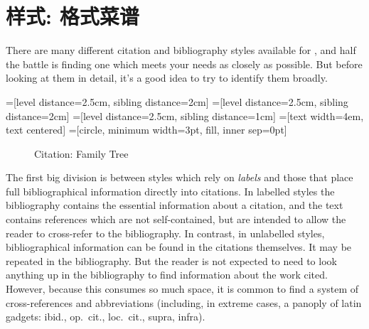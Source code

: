 \chapter{样式: 格式菜谱}\label{ch:bibstyles}

There are many different citation and bibliography styles available
for \biblatex, and half the battle is finding one which meets your
needs as closely as possible. But before looking at them in detail,
it's a good idea to try to identify them broadly.

=[level distance=2.5cm, sibling distance=2cm]
=[level distance=2.5cm, sibling distance=2cm]
=[level distance=2.5cm, sibling distance=1cm]
=[text width=4em, text centered]
=[circle, minimum width=3pt, fill, inner sep=0pt]

\begin{figure}
\sffamily
{}
\caption{Citation: Family Tree}
\end{figure}
The first big division is between styles which rely on \emph{labels}
and those that place full bibliographical information directly into
citations. In labelled styles the bibliography contains the essential
information about a citation, and the text contains references which
are not self-contained, but are intended to allow the reader to
cross-refer to the bibliography. In contrast, in unlabelled styles,
bibliographical information can be found in the citations
themselves. It may be repeated in the bibliography. But the reader is
not expected to need to look anything up in the bibliography to find
information about the work cited. However, because this consumes so
much space, it is common to find a system of cross-references and
abbreviations (including, in extreme cases, a panoply of latin
gadgets: ibid., op.\ cit., loc.\ cit., supra, infra).

